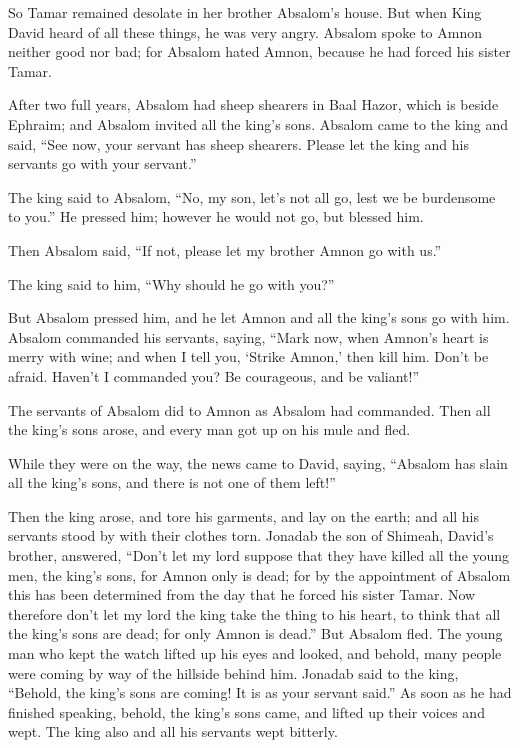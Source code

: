 So Tamar remained desolate in her brother Absalom’s house.
\myverse{}But when King David heard of all these things, he was very angry.
\myverse{}Absalom spoke to Amnon neither good nor bad; for Absalom hated Amnon, because
he had forced his sister Tamar.

\myverse{}After two full years, Absalom had sheep shearers in Baal Hazor,
which is beside Ephraim; and Absalom invited all the king’s sons.
\myverse{}Absalom came to the king and said, “See now, your servant has sheep shearers.
Please let the king and his servants go with your servant.”

\myverse{}The king said to Absalom, “No, my son, let’s not all go, lest
we be burdensome to you.” He pressed him; however he would not go, but blessed him.

\myverse{}Then Absalom said, “If not, please let my brother Amnon go with
us.”

The king said to him, “Why should he go with you?”

\myverse{}But Absalom pressed him, and he let Amnon and all the king’s
sons go with him.
\myverse{}Absalom commanded his servants, saying, “Mark now, when Amnon’s heart is
merry with wine; and when I tell you, ‘Strike Amnon,’ then kill him. Don’t be afraid. Haven’t I commanded
you? Be courageous, and be valiant!”

\myverse{}The servants of Absalom did to Amnon as Absalom had commanded.
Then all the king’s sons arose, and every man got up on his mule and fled.

\myverse{}While they were on the way, the news came to David, saying,
“Absalom has slain all the king’s sons, and there is not one of them left!”

\myverse{}Then the king arose, and tore his garments, and lay on the earth;
and all his servants stood by with their clothes torn.
\myverse{}Jonadab the son of Shimeah, David’s brother, answered, “Don’t let my lord
suppose that they have killed all the young men, the king’s sons, for Amnon only is dead; for by the appointment
of Absalom this has been determined from the day that he forced his sister Tamar.
\myverse{}Now therefore don’t let my lord the king take the thing to his heart, to
think that all the king’s sons are dead; for only Amnon is dead.”
\myverse{}But Absalom fled. The young man who kept the watch lifted up his eyes and
looked, and behold, many people were coming by way of the hillside behind him.
\myverse{}Jonadab said to the king, “Behold, the king’s sons are coming! It is as your
servant said.”
\myverse{}As soon as he had finished speaking, behold, the king’s sons came, and lifted
up their voices and wept. The king also and all his servants wept bitterly.

